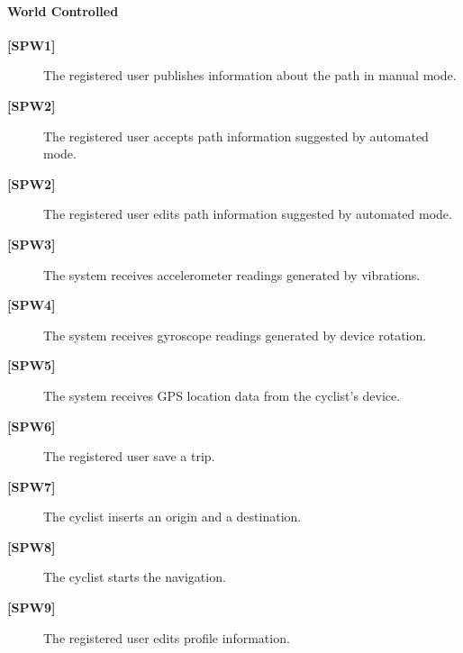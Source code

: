 \paragraph{World Controlled}
\begin{description}
    \item[\textbf{[SPW1]}] The registered user publishes information about the path in manual mode.

    \item[\textbf{[SPW2]}] The registered user accepts path information suggested by automated mode.

    \item[\textbf{[SPW2]}] The registered user edits path information suggested by automated mode. 

    \item[\textbf{[SPW3]}] The system receives accelerometer readings generated by vibrations.

    \item[\textbf{[SPW4]}] The system receives gyroscope readings generated by device rotation.

    \item[\textbf{[SPW5]}] The system receives GPS location data from the cyclist’s device.

    \item[\textbf{[SPW6]}] The registered user save a trip. 

    \item[\textbf{[SPW7]}] The cyclist inserts an origin and a destination.

    \item[\textbf{[SPW8]}] The cyclist starts the navigation.

    \item[\textbf{[SPW9]}] The registered user edits profile information.
\end{description}


